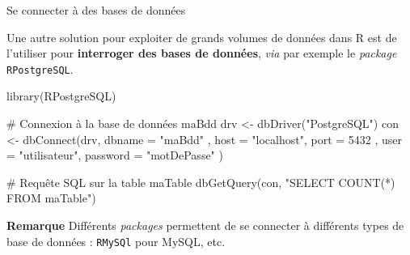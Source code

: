 \documentclass[12pt,ignorenonframetext,]{beamer}
\newenvironment{Shaded}{}{}
\newcommand{\KeywordTok}[1]{\textcolor[rgb]{0.00,0.00,1.00}{#1}}
\newcommand{\DataTypeTok}[1]{#1}
\newcommand{\DecValTok}[1]{#1}
\newcommand{\StringTok}[1]{\textcolor[rgb]{0.00,0.50,0.50}{#1}}
\newcommand{\CommentTok}[1]{\textcolor[rgb]{0.00,0.50,0.00}{#1}}
\newcommand{\NormalTok}[1]{#1}
\renewenvironment{Shaded}{\begin{snugshade}}{\end{snugshade}}
\newcommand{\intertitre}[1]{\textcolor{redInsee}{\textbf{#1}}}
\begin{document}
\begin{frame}[fragile]{\large Se connecter à des bases de données}

Une autre solution pour exploiter de grands volumes de données dans R
est de l'utiliser pour \textbf{interroger des bases de données},
\emph{via} par exemple le \emph{package} \texttt{RPostgreSQL}.

\pause \footnotesize

\begin{Shaded}
\begin{Highlighting}[]
\KeywordTok{library}\NormalTok{(RPostgreSQL)}

\CommentTok{# Connexion à la base de données maBdd}
\NormalTok{drv <-}\StringTok{ }\KeywordTok{dbDriver}\NormalTok{(}\StringTok{"PostgreSQL"}\NormalTok{)}
\NormalTok{con <-}\StringTok{ }\KeywordTok{dbConnect}\NormalTok{(drv, }\DataTypeTok{dbname =} \StringTok{"maBdd"}
\NormalTok{  , }\DataTypeTok{host =} \StringTok{"localhost"}\NormalTok{, }\DataTypeTok{port =} \DecValTok{5432}
\NormalTok{  , }\DataTypeTok{user =} \StringTok{"utilisateur"}\NormalTok{, }\DataTypeTok{password =} \StringTok{"motDePasse"}
\NormalTok{)}

\CommentTok{# Requête SQL sur la table maTable}
\KeywordTok{dbGetQuery}\NormalTok{(con, }\StringTok{"SELECT COUNT(*) FROM maTable"}\NormalTok{)}
\end{Highlighting}
\end{Shaded}

\normalsize

\pause \intertitre{Remarque} Différents \emph{packages} permettent de se
connecter à différents types de base de données : \texttt{RMySQl} pour
MySQL, etc.

\end{frame}
\end{document}
